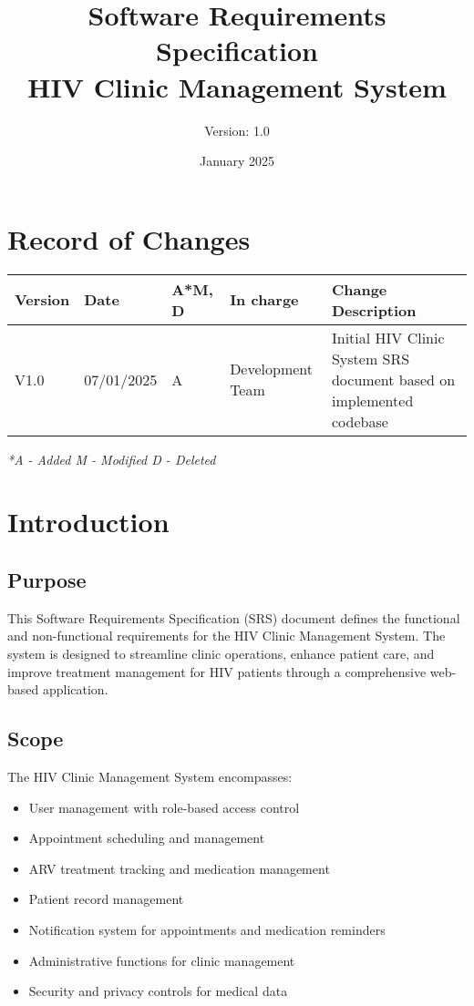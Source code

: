 \documentclass[12pt,a4paper]{article}
\title{\textbf{Software Requirements Specification\\HIV Clinic Management System}}
\author{Version: 1.0}
\date{January 2025}
\begin{document}
\maketitle
\thispagestyle{empty}

\newpage

\section*{Record of Changes}

\begin{longtable}{|p{2cm}|p{2cm}|p{1cm}|p{3cm}|p{6cm}|}
\hline
\textbf{Version} & \textbf{Date} & \textbf{A*M, D} & \textbf{In charge} & \textbf{Change Description} \\
\hline
V1.0 & 07/01/2025 & A & Development Team & Initial HIV Clinic System SRS document based on implemented codebase \\
\hline
\end{longtable}

\textit{*A - Added M - Modified D - Deleted}

\newpage

\tableofcontents

\newpage

\section{Introduction}

\subsection{Purpose}

This Software Requirements Specification (SRS) document defines the functional and non-functional requirements for the HIV Clinic Management System. The system is designed to streamline clinic operations, enhance patient care, and improve treatment management for HIV patients through a comprehensive web-based application.

\subsection{Scope}

The HIV Clinic Management System encompasses:

\begin{itemize}
    \item User management with role-based access control
    \item Appointment scheduling and management
    \item ARV treatment tracking and medication management
    \item Patient record management
    \item Notification system for appointments and medication reminders
    \item Administrative functions for clinic management
    \item Security and privacy controls for medical data
\end{itemize}
\end{document}

